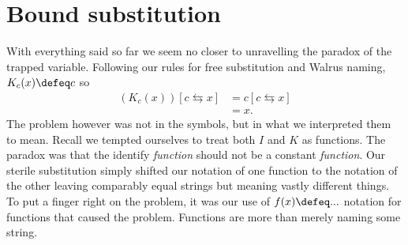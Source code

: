 \section{Bound substitution}
With everything said so far we seem no closer to unravelling the paradox 
of the trapped variable.  Following our rules for free substitution and 
Walrus naming, $K_c(x)\defeq c$ so 
\begin{align*}
    \tag{judgemental equality}
    (K_c(x))[c\leftrightarrows x] 
    & = c[c\leftrightarrows x]\\
    \tag{Free.match}
    & = x.
\end{align*}
The problem however was not in the symbols, but in what we interpreted them 
to mean.  Recall we tempted ourselves to treat both $I$ and $K$ as functions.
The paradox was that the identify \emph{function} should not be a  
constant \emph{function}.  Our sterile substitution simply shifted our notation 
of one function to the notation of the other leaving comparably equal strings 
but meaning vastly different things.  To put a finger right on the problem, 
it was our use of $f(x)\defeq...$ notation for functions that caused the problem.
Functions are more than merely naming some string.

